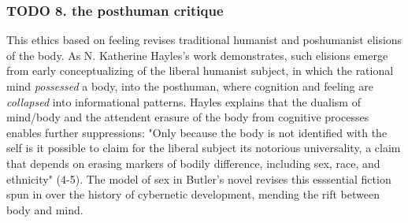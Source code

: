 \documentclass[11pt]{article}
\begin{document}
\subsubsection{{\bfseries\sffamily TODO} 8. the posthuman critique}
\label{sec:orgec4a08f}
This ethics based on feeling revises traditional humanist and
poshumanist elisions of the body. As N. Katherine Hayles's work
demonstrates, such elisions emerge from early conceptualizing of the
liberal humanist subject, in which the rational mind \emph{possessed} a
body, into the posthuman, where cognition and feeling are \emph{collapsed}
into informational patterns. Hayles explains that the dualism of
mind/body and the attendent erasure of the body from cognitive
processes enables further suppressions: "Only because the body is not
identified with the self is it possible to claim for the liberal
subject its notorious universality, a claim that depends on erasing
markers of bodily difference, including sex, race, and ethnicity"
(4-5). The model of sex in Butler's novel revises this esssential
fiction spun in over the history of cybernetic development, mending
the rift between body and mind.
\end{document}
